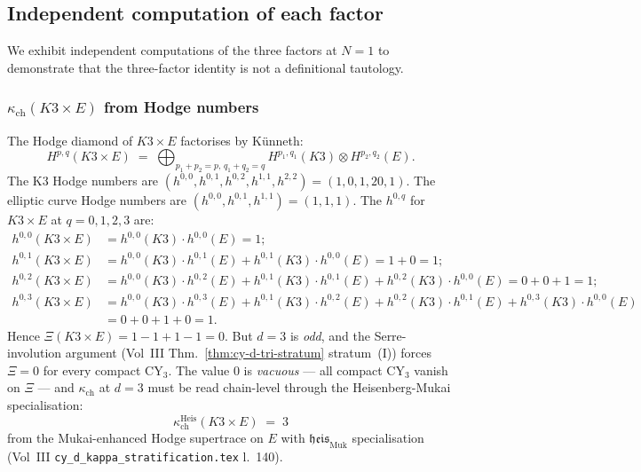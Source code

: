 \documentclass[11pt]{article}
\theoremstyle{definition}
\newcommand{\kch}{\kappa_{\mathrm{ch}}}
\begin{document}
\subsection{Independent computation of each factor}

We exhibit independent computations of the three factors at $N = 1$ to
demonstrate that the three-factor identity is not a definitional
tautology.

\subsubsection{$\kch(K3 \times E)$ from Hodge numbers}

The Hodge diamond of $K3 \times E$ factorises by K\"unneth:
\[
   H^{p, q}(K3 \times E)
   \;=\; \bigoplus_{p_1 + p_2 = p,\, q_1 + q_2 = q}
        H^{p_1, q_1}(K3) \otimes H^{p_2, q_2}(E).
\]
The K3 Hodge numbers are $(h^{0,0}, h^{0,1}, h^{0,2}, h^{1,1}, h^{2,2})
= (1, 0, 1, 20, 1)$. The elliptic curve Hodge numbers are
$(h^{0,0}, h^{0,1}, h^{1,1}) = (1, 1, 1)$. The $h^{0, q}$ for $K3 \times E$
at $q = 0, 1, 2, 3$ are:
\begin{align*}
   h^{0, 0}(K3 \times E) &= h^{0,0}(K3) \cdot h^{0,0}(E) = 1; \\
   h^{0, 1}(K3 \times E) &= h^{0,0}(K3) \cdot h^{0,1}(E)
                          + h^{0,1}(K3) \cdot h^{0,0}(E) = 1 + 0 = 1; \\
   h^{0, 2}(K3 \times E) &= h^{0,0}(K3) \cdot h^{0,2}(E)
                          + h^{0,1}(K3) \cdot h^{0,1}(E)
                          + h^{0,2}(K3) \cdot h^{0,0}(E)
                        = 0 + 0 + 1 = 1; \\
   h^{0, 3}(K3 \times E) &= h^{0,0}(K3) \cdot h^{0,3}(E)
                          + h^{0,1}(K3) \cdot h^{0,2}(E)
                          + h^{0,2}(K3) \cdot h^{0,1}(E)
                          + h^{0,3}(K3) \cdot h^{0,0}(E) \\
                        &= 0 + 0 + 1 + 0 = 1.
\end{align*}
Hence $\Xi(K3 \times E) = 1 - 1 + 1 - 1 = 0$. But $d = 3$ is \emph{odd},
and the Serre-involution argument (Vol~III Thm.~\ref{thm:cy-d-tri-stratum}
stratum~(I)) forces $\Xi = 0$ for every compact CY$_3$. The value $0$
is \emph{vacuous} --- all compact CY$_3$ vanish on $\Xi$ --- and $\kch$
at $d = 3$ must be read chain-level through the Heisenberg-Mukai
specialisation:
\[
   \kch^{\mathrm{Heis}}(K3 \times E) \;=\; 3
\]
from the Mukai-enhanced Hodge supertrace on $E$ with $\mathfrak{heis}_{\mathrm{Muk}}$
specialisation (Vol~III \texttt{cy\_d\_kappa\_stratification.tex} l.~140).
\end{document}
